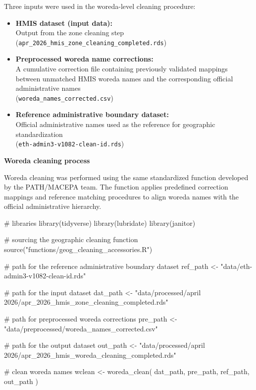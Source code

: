\documentclass[
  letterpaper,
  DIV=11,
  numbers=noendperiod]{scrartcl}
\newenvironment{Shaded}{\begin{snugshade}}{\end{snugshade}}
\newcommand{\CommentTok}[1]{\textcolor[rgb]{0.37,0.37,0.37}{#1}}
\newcommand{\FunctionTok}[1]{\textcolor[rgb]{0.28,0.35,0.67}{#1}}
\newcommand{\NormalTok}[1]{\textcolor[rgb]{0.00,0.23,0.31}{#1}}
\newcommand{\OtherTok}[1]{\textcolor[rgb]{0.00,0.23,0.31}{#1}}
\newcommand{\StringTok}[1]{\textcolor[rgb]{0.13,0.47,0.30}{#1}}
\begin{document}
Three inputs were used in the woreda-level cleaning procedure:

\begin{itemize}
\item
  \textbf{HMIS dataset (input data):}\\
  Output from the zone cleaning step\\
  (\texttt{apr\_2026\_hmis\_zone\_cleaning\_completed.rds})
\item
  \textbf{Preprocessed woreda name corrections:}\\
  A cumulative correction file containing previously validated mappings
  between unmatched HMIS woreda names and the corresponding official
  administrative names\\
  (\texttt{woreda\_names\_corrected.csv})
\item
  \textbf{Reference administrative boundary dataset:}\\
  Official administrative names used as the reference for geographic
  standardization\\
  (\texttt{eth-admin3-v1082-clean-id.rds})
\end{itemize}

\textbf{Woreda cleaning process}

Woreda cleaning was performed using the same standardized function
developed by the PATH/MACEPA team. The function applies predefined
correction mappings and reference matching procedures to align woreda
names with the official administrative hierarchy.

\begin{Shaded}
\begin{Highlighting}[]
\CommentTok{\# libraries }
\FunctionTok{library}\NormalTok{(tidyverse) }
\FunctionTok{library}\NormalTok{(lubridate) }
\FunctionTok{library}\NormalTok{(janitor)}

\CommentTok{\# sourcing the geographic cleaning function}
\FunctionTok{source}\NormalTok{(}\StringTok{"functions/geog\_cleaning\_accessories.R"}\NormalTok{)}

\CommentTok{\# path for the reference administrative boundary dataset}
\NormalTok{ref\_path }\OtherTok{\textless{}{-}} \StringTok{"data/eth{-}admin3{-}v1082{-}clean{-}id.rds"}

\CommentTok{\# path for the input dataset}
\NormalTok{dat\_path }\OtherTok{\textless{}{-}} \StringTok{"data/processed/april 2026/apr\_2026\_hmis\_zone\_cleaning\_completed.rds"}

\CommentTok{\# path for preprocessed woreda corrections}
\NormalTok{pre\_path }\OtherTok{\textless{}{-}} \StringTok{"data/preprocessed/woreda\_names\_corrected.csv"}

\CommentTok{\# path for the output dataset}
\NormalTok{out\_path }\OtherTok{\textless{}{-}} \StringTok{"data/processed/april 2026/apr\_2026\_hmis\_woreda\_cleaning\_completed.rds"}

\CommentTok{\# clean woreda names}
\NormalTok{wclean }\OtherTok{\textless{}{-}} \FunctionTok{woreda\_clean}\NormalTok{( dat\_path, pre\_path, ref\_path, out\_path )}
\end{Highlighting}
\end{Shaded}
\end{document}
